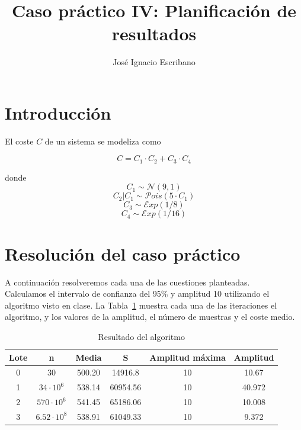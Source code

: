 \documentclass[12pt,a4paper,twoside,openright,titlepage,final]{article}
\author{José Ignacio Escribano}
\title{Caso práctico IV: Planificación de resultados}
\begin{document}
\setcounter{page}{1}


\listoftables
\thispagestyle{empty}
\newpage

\listoffigures
\thispagestyle{empty}
\newpage

\tableofcontents
\thispagestyle{empty}
\newpage


\setcounter{page}{1}

\section{Introducción}

El coste $C$ de un sistema se modeliza como 

\[ C = C_1 \cdot C_2 + C_3 \cdot C_4 \]

donde \\

\[C_1 \sim \mathcal{N}(9, 1)\] 
\[C_2 | C_1 \sim \mathcal{P}ois(5\cdot C_1)\] 
\[C_3 \sim \mathcal{E}xp(1/8)\]
\[C_4 \sim \mathcal{E}xp(1/16)\]

\section{Resolución del caso práctico}

A continuación resolveremos cada una de las cuestiones planteadas.\\

Calculamos el intervalo de confianza del 95\% y amplitud 10 utilizando el algoritmo visto en clase. La Tabla~\ref{tbl:resultado} muestra cada una de las iteraciones el algoritmo, y los valores de la amplitud, el número de muestras y el coste medio.

\begin{table}[htbp!]
	\centering
	\caption{Resultado del algoritmo}
	\label{tbl:resultado}
	\begin{tabular}{@{}cccccc@{}}
		\toprule
		Lote & n                & Media  & S        & Amplitud máxima & Amplitud \\ \midrule
		0    & 30               & 500.20 & 14916.8  & 10              & 10.67    \\
		1    & $34\cdot 10^6$   & 538.14 & 60954.56 & 10              & 40.972   \\
		2    & $570\cdot 10^6$  & 541.45 & 65186.06 & 10              & 10.008   \\
		3    & $6.52\cdot 10^8$ & 538.91 & 61049.33 & 10              & 9.372    \\ \bottomrule
	\end{tabular}
\end{table}
\end{document}
